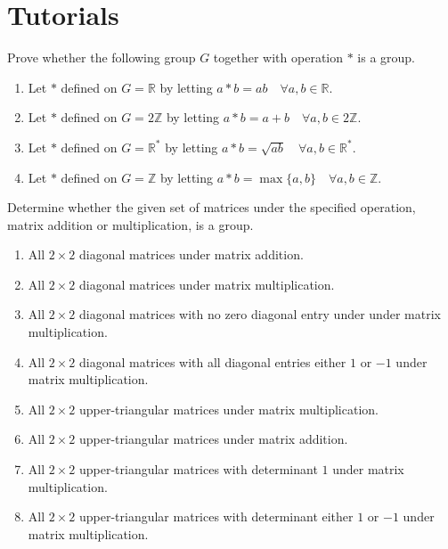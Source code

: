 \section*{Tutorials}

\begin{mdframed}
    \vspace{-0.25cm}
    \hspace{-0.25cm}
    \begin{Exercise}
        Prove whether the following group $G$ together with operation $*$ is a group.
        \begin{enumerate}
            \item Let $*$ defined on $G = \mathbb{R}$ by letting $a * b = ab \quad \forall a, b \in \mathbb{R}$.
            \item Let $*$ defined on $G = 2\mathbb{Z}$ by letting $a * b = a + b \quad \forall a, b \in 2\mathbb{Z}$.
            \item Let $*$ defined on $G = \mathbb{R}^*$ by letting $a * b = \sqrt{ab} \quad \forall a, b \in \mathbb{R}^*$.
            \item Let $*$ defined on $G = \mathbb{Z}$ by letting $a * b = \max \{a,b\} \quad \forall a, b \in \mathbb{Z}$.
        \end{enumerate}
    \end{Exercise}

    \vspace{0.752cm}
    \begin{Exercise}
        Determine whether the given set of matrices under the specified operation, matrix addition or multiplication, is a group.
        \begin{enumerate}
            \item All $2 \times 2$ diagonal matrices under matrix addition.
            \item All $2 \times 2$ diagonal matrices under matrix multiplication.
            \item All $2 \times 2$ diagonal matrices with no zero diagonal entry under under matrix multiplication.
            \item All $2 \times 2$ diagonal matrices with all diagonal entries either $1$ or $-1$ under matrix multiplication.
            \item All $2 \times 2$ upper-triangular matrices under matrix multiplication.
            \item All $2 \times 2$ upper-triangular matrices under matrix addition.
            \item All $2 \times 2$ upper-triangular matrices with determinant $1$ under matrix multiplication.
            \item All $2 \times 2$ upper-triangular matrices with determinant either $1$ or $-1$ under matrix multiplication.
        \end{enumerate}
    \end{Exercise}


\end{mdframed}
